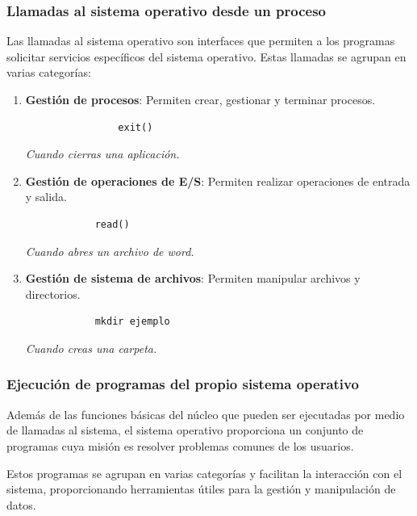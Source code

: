 	\subsubsection{Llamadas al sistema operativo desde un proceso}
Las llamadas al sistema operativo son interfaces que permiten a los programas solicitar servicios específicos del sistema operativo. Estas llamadas se agrupan en varias categorías:
\begin{tcolorbox} 
	
		\begin{enumerate}
			\item\textbf{ Gestión de procesos}: Permiten crear, gestionar y terminar procesos. 
			\begin{lstlisting}
				exit()
			\end{lstlisting}
			
			\textit{Cuando cierras una aplicación.}
			 \item \textbf{Gestión de operaciones de E/S}: Permiten realizar operaciones de entrada y salida.
		\begin{lstlisting}
			read()
		\end{lstlisting}
		\textit{Cuando abres un archivo de word.}

		
		\item \textbf{Gestión de sistema de archivos}: Permiten manipular archivos y directorios. 
		\begin{lstlisting}
			mkdir ejemplo
		\end{lstlisting}
		
		\textit{Cuando creas una carpeta.}
		\end{enumerate}

\end{tcolorbox}
	
	
	\subsubsection{Ejecución de programas del propio sistema operativo}
	Además de las funciones básicas del núcleo que pueden ser ejecutadas por medio de llamadas al sistema, el sistema operativo proporciona un conjunto de programas cuya misión es resolver problemas comunes de los usuarios. 
	
	Estos programas se agrupan en varias categorías y facilitan la interacción con el sistema, proporcionando herramientas útiles para la gestión y manipulación de datos.
	

